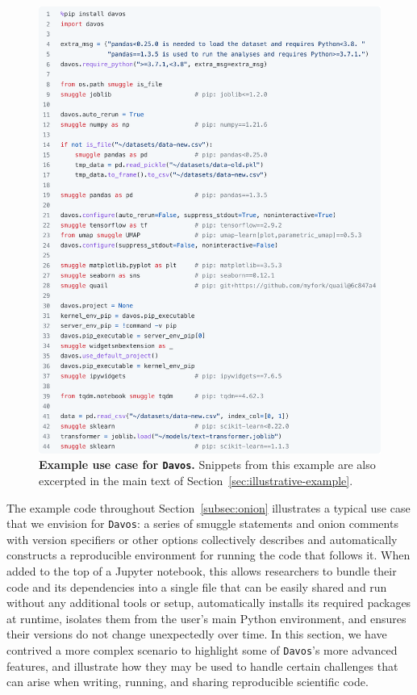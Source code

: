 \documentclass[preprint,12pt,a4paper]{elsarticle}
\begin{document}
\begin{figure}[tp]
\centering
\includegraphics[width=\textwidth]{figs/illustrative_example}
\caption{\small \textbf{Example use case for \texttt{Davos}.}
  Snippets from this example are also excerpted in the main text of
  Section~\ref{sec:illustrative-example}.}
\label{fig:illustrative-example}
\end{figure}

The example code throughout Section~\ref{subsec:onion} illustrates a typical use case that we envision for \texttt{Davos}: a series of smuggle statements and onion comments with version specifiers or other options collectively describes and automatically constructs a reproducible environment for running the code that follows it.
When added to the top of a Jupyter notebook, this allows researchers to bundle their code and its dependencies into a single file that can be easily shared and run without any additional tools or setup, automatically installs its required packages at runtime, isolates them from the user's main Python environment, and ensures their versions do not change unexpectedly over time.
In this section, we have contrived a more complex scenario to highlight some of \texttt{Davos}'s more advanced features, and illustrate how they may be used to handle certain challenges that can arise when writing, running, and sharing reproducible scientific code.
\end{document}

